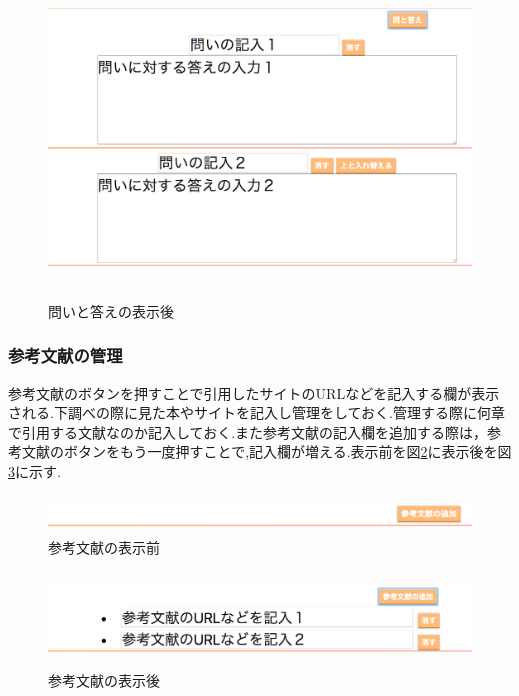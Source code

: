 \documentclass[a4j,12pt]{jarticle}
\begin{document}
\begin{figure}[h]
\begin{center}
 \includegraphics[clip,width=130mm,height=85mm]{figure/05qanda.png}
\end{center}
 \caption{問いと答えの表示後}
 \label{fig:m}
\end{figure}
\newpage

\subsubsection{参考文献の管理}
参考文献のボタンを押すことで引用したサイトのURLなどを記入する欄が表示される.下調べの際に見た本やサイトを記入し管理をしておく.管理する際に何章で引用する文献なのか記入しておく.また参考文献の記入欄を追加する際は，参考文献のボタンをもう一度押すことで,記入欄が増える.表示前を図\ref{fig:n}に表示後を図\ref{fig:o}に示す.

\begin{figure}[h]
\begin{center}
 \includegraphics[clip,width=150mm,height=10mm]{figure/06sankou.png}
\end{center}
 \caption{参考文献の表示前}
 \label{fig:n}
\end{figure}

\begin{figure}[h]
\begin{center}
 \includegraphics[clip,width=150mm,height=25mm]{figure/07sankou.png}
\end{center}
 \caption{参考文献の表示後}
 \label{fig:o}
\end{figure}
\end{document}
